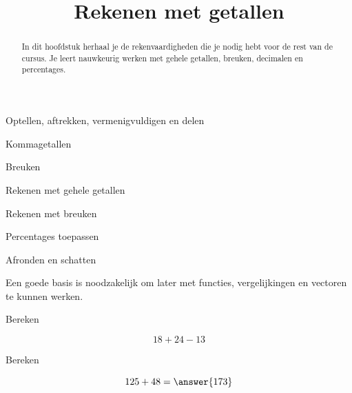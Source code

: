 \documentclass{ximera}
\title{Rekenen met getallen}
\begin{document}
\begin{abstract}
    In dit hoofdstuk herhaal je de rekenvaardigheden die je nodig hebt voor de rest van de cursus. Je leert nauwkeurig werken met gehele getallen, breuken, decimalen en percentages.
    \end{abstract}
    
    \maketitle
    




\begin{voorkennis}

\item Optellen, aftrekken, vermenigvuldigen en delen
\item Kommagetallen
\item Breuken

\end{voorkennis}

\begin{leerdoelen}

\item Rekenen met gehele getallen
\item Rekenen met breuken
\item Percentages toepassen
\item Afronden en schatten

\end{leerdoelen}


Een goede basis is noodzakelijk om later met functies, vergelijkingen en vectoren te kunnen werken.

\begin{example}
Bereken

\[
18+24-13
\]
\end{example}

\begin{exercise}
Bereken

\[
125+48=\answer{173}
\]
\end{exercise}
\end{document}
